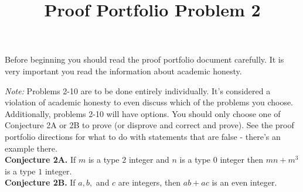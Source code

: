 \documentclass{article}  %
\title{Proof Portfolio Problem 2}
\author{}
\date{}
\begin{document}
\maketitle



Before beginning you should read the proof portfolio document carefully.  It is very important you read the information about academic honesty. 




	
\emph{Note:} Problems 2-10 are to be done entirely individually. It's considered a violation of academic honesty to even discuss which of the problems you choose.  Additionally, problems 2-10 will have options. You should only choose one of Conjecture 2A or 2B to prove (or disprove and correct and prove). See the proof portfolio directions for what to do with statements that are false - there's an example there.\\



\noindent\textbf{Conjecture 2A.}  If $m$ is a type $2$ integer and $n$ is a type $0$ integer then $mn+m^3$ is a type $1$ integer.\\


\noindent\textbf{Conjecture 2B.}  If $a,b,$ and $c$ are integers, then $ab+ac$ is an even integer.
\end{document}

